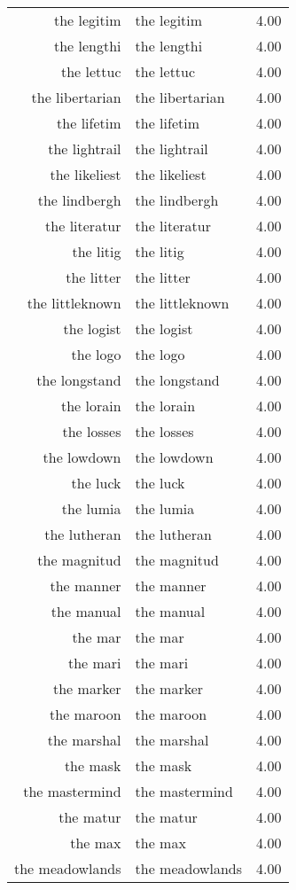 \begin{table}[ht]
\begin{tabular}{rlr}
  the legitim & the legitim & 4.00 \\ 
  the lengthi & the lengthi & 4.00 \\ 
  the lettuc & the lettuc & 4.00 \\ 
  the libertarian & the libertarian & 4.00 \\ 
  the lifetim & the lifetim & 4.00 \\ 
  the lightrail & the lightrail & 4.00 \\ 
  the likeliest & the likeliest & 4.00 \\ 
  the lindbergh & the lindbergh & 4.00 \\ 
  the literatur & the literatur & 4.00 \\ 
  the litig & the litig & 4.00 \\ 
  the litter & the litter & 4.00 \\ 
  the littleknown & the littleknown & 4.00 \\ 
  the logist & the logist & 4.00 \\ 
  the logo & the logo & 4.00 \\ 
  the longstand & the longstand & 4.00 \\ 
  the lorain & the lorain & 4.00 \\ 
  the losses & the losses & 4.00 \\ 
  the lowdown & the lowdown & 4.00 \\ 
  the luck & the luck & 4.00 \\ 
  the lumia & the lumia & 4.00 \\ 
  the lutheran & the lutheran & 4.00 \\ 
  the magnitud & the magnitud & 4.00 \\ 
  the manner & the manner & 4.00 \\ 
  the manual & the manual & 4.00 \\ 
  the mar & the mar & 4.00 \\ 
  the mari & the mari & 4.00 \\ 
  the marker & the marker & 4.00 \\ 
  the maroon & the maroon & 4.00 \\ 
  the marshal & the marshal & 4.00 \\ 
  the mask & the mask & 4.00 \\ 
  the mastermind & the mastermind & 4.00 \\ 
  the matur & the matur & 4.00 \\ 
  the max & the max & 4.00 \\ 
  the meadowlands & the meadowlands & 4.00 \\ 

\end{tabular}
\end{table}

